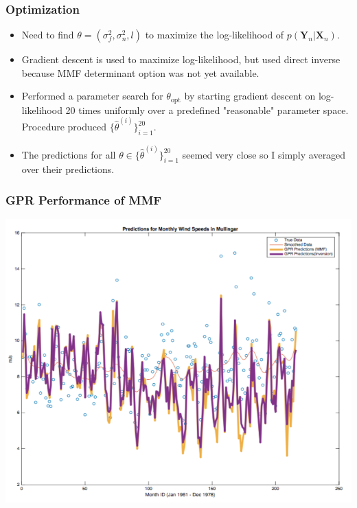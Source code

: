 \documentclass{beamer}
\begin{document}
\begin{frame}
\frametitle{Optimization}
\begin{itemize}
\item Need to find $\theta = (\sigma_f^2, \sigma_n^2, l)$ to maximize the log-likelihood of $p(\textbf{Y}_n|\textbf{X}_n)$.
\item Gradient descent is used to maximize log-likelihood, but used direct inverse because MMF determinant option was not yet available.
\item Performed a parameter search for $\theta_\mathrm{opt}$ by starting gradient descent on log-likelihood 20 times uniformly over a predefined "reasonable" parameter space. Procedure produced $\{\hat \theta^{(i)}\}_{i=1}^{20}$.
\item The predictions for all $\theta\in \{\hat \theta^{(i)}\}_{i=1}^{20}$ seemed very close so I simply averaged over their predictions.
\end{itemize}
\end{frame}

\begin{frame}
\frametitle{GPR Performance of MMF}
\begin{center}
\includegraphics[scale=0.4]{fig2.png}
\end{center}
\end{frame}
\end{document}
